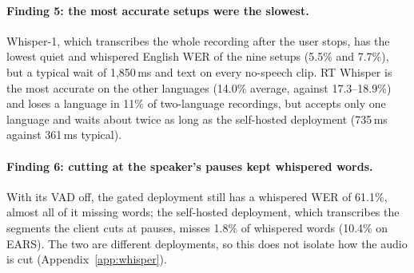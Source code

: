 \documentclass[11pt]{article}
\begin{document}
\paragraph{Finding 5: the most accurate setups were the slowest.} Whisper-1, which transcribes the whole recording after the user stops, has the lowest quiet and whispered English WER of the nine setups (5.5\% and 7.7\%), but a typical wait of 1{,}850\,ms and text on every no-speech clip. RT Whisper is the most accurate on the other languages (14.0\% average, against 17.3--18.9\%) and loses a language in 11\% of two-language recordings, but accepts only one language and waits about twice as long as the self-hosted deployment (735\,ms against 361\,ms typical).

\paragraph{Finding 6: cutting at the speaker's pauses kept whispered words.} With its VAD off, the gated deployment still has a whispered WER of 61.1\%, almost all of it missing words; the self-hosted deployment, which transcribes the segments the client cuts at pauses, misses 1.8\% of whispered words (10.4\% on EARS). The two are different deployments, so this does not isolate how the audio is cut (Appendix~\ref{app:whisper}).

\FloatBarrier
\end{document}
